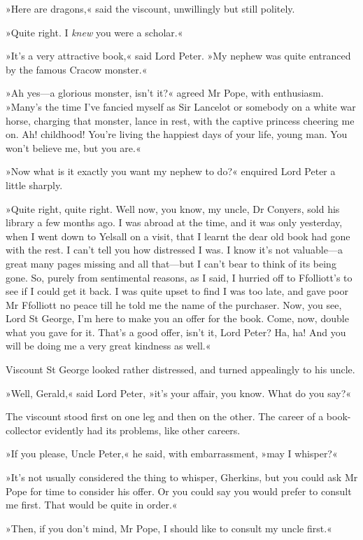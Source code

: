 »Here are dragons,« said the viscount, unwillingly but still politely.

»Quite right. I \textit{knew} you were a scholar.«

»It's a very attractive book,« said Lord Peter. »My nephew was quite entranced by the famous Cracow monster.«

»Ah yes—a glorious monster, isn't it?« agreed Mr Pope, with enthusiasm. »Many's the time I've fancied myself as Sir Lancelot or somebody on a white war horse, charging that monster, lance in rest, with the captive princess cheering me on. Ah! childhood! You're living the happiest days of your life, young man. You won't believe me, but you are.«

»Now what is it exactly you want my nephew to do?« enquired Lord Peter a little sharply.

»Quite right, quite right. Well now, you know, my uncle, Dr Conyers, sold his library a few months ago. I was abroad at the time, and it was only yesterday, when I went down to Yelsall on a visit, that I learnt the dear old book had gone with the rest. I can't tell you how distressed I was. I know it's not valuable—a great many pages missing and all that—but I can't bear to think of its being gone. So, purely from sentimental reasons, as I said, I hurried off to Ffolliott's to see if I could get it back. I was quite upset to find I was too late, and gave poor Mr Ffolliott no peace till he told me the name of the purchaser. Now, you see, Lord St George, I'm here to make you an offer for the book. Come, now, double what you gave for it. That's a good offer, isn't it, Lord Peter? Ha, ha! And you will be doing me a very great kindness as well.«

Viscount St George looked rather distressed, and turned appealingly to his uncle.

»Well, Gerald,« said Lord Peter, »it's your affair, you know. What do you say?«

The viscount stood first on one leg and then on the other. The career of a book-collector evidently had its problems, like other careers.

»If you please, Uncle Peter,« he said, with embarrassment, »may I whisper?«

»It's not usually considered the thing to whisper, Gherkins, but you could ask Mr Pope for time to consider his offer. Or you could say you would prefer to consult me first. That would be quite in order.«

»Then, if you don't mind, Mr Pope, I should like to consult my uncle first.«

